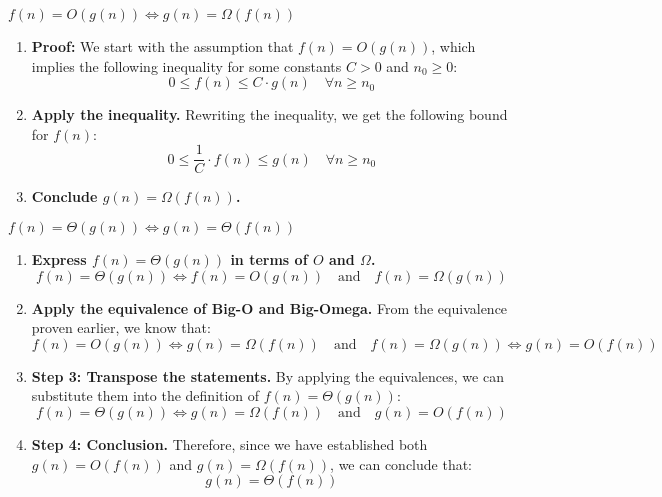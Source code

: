     \begin{derivation}
        \( f(n) = O(g(n)) \iff g(n) = \Omega(f(n)) \)
        \begin{enumerate}
            
            \item \textbf{Proof:} We start with the assumption that \( f(n) = O(g(n)) \), which implies the following inequality for some constants \( C > 0 \) and \( n_0 \geq 0 \):
            \[
            0 \leq f(n) \leq C \cdot g(n) \quad \forall n \geq n_0
            \]
            
            \item \textbf{Apply the inequality.}
            Rewriting the inequality, we get the following bound for \( f(n) \):
            \[
            0 \leq \frac{1}{C} \cdot f(n) \leq g(n) \quad \forall n \geq n_0
            \]
            
            \item \textbf{Conclude \( g(n) = \Omega(f(n)) \).}
        \end{enumerate}        
    \end{derivation}

    \begin{derivation} \( f(n) = \Theta(g(n)) \iff g(n) = \Theta(f(n)) \)
        \begin{enumerate}
            
            \item \textbf{Express \( f(n) = \Theta(g(n)) \) in terms of \( O \) and \( \Omega \).}
            \[
            f(n) = \Theta(g(n)) \iff f(n) = O(g(n)) \quad \text{and} \quad f(n) = \Omega(g(n))
            \]
        
            \item \textbf{Apply the equivalence of Big-O and Big-Omega.}
            From the equivalence proven earlier, we know that:
            \[
            f(n) = O(g(n)) \iff g(n) = \Omega(f(n)) \quad \text{and} \quad f(n) = \Omega(g(n)) \iff g(n) = O(f(n))
            \]
            
            \item \textbf{Step 3: Transpose the statements.}
            By applying the equivalences, we can substitute them into the definition of \( f(n) = \Theta(g(n)) \):
            \[
            f(n) = \Theta(g(n)) \iff g(n) = \Omega(f(n)) \quad \text{and} \quad g(n) = O(f(n))
            \]
            
            \item \textbf{Step 4: Conclusion.}
            Therefore, since we have established both \( g(n) = O(f(n)) \) and \( g(n) = \Omega(f(n)) \), we can conclude that:
            \[
            g(n) = \Theta(f(n))
            \]
        \end{enumerate}
    \end{derivation}

